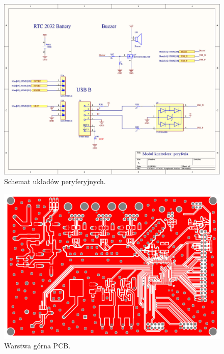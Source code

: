 \begin{figure}
    \begin{center}
        \includegraphics[width = 21cm]{zalaczniki/kontroler/Kontroler_Strona_10.jpg}
        \caption{Schemat układów peryferyjnych.}
    \end{center}
\end{figure}

\begin{figure}
    \begin{center}
        \includegraphics[width = 15cm]{zalaczniki/kontroler/Kontroler_Strona_11.jpg}
        \caption{Warstwa górna PCB.}
    \end{center}
\end{figure}

